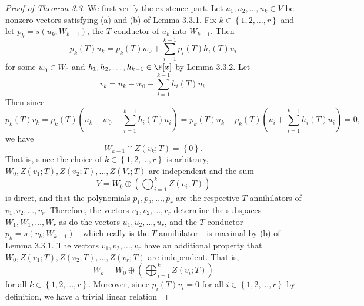 \documentclass[math_245.tex]{subfiles}
\begin{document}
    \begin{proof}[Proof of Theorem 3.3]
        We first verify the existence part. Let $u_1,u_2,\ldots,u_k\in V$ be nonzero vectors satisfying (a) and (b) of Lemma 3.3.1. Fix $k\in\left\lbrace 1,2,\ldots,r \right\rbrace $ and let $p_k=s\left( u_k;W_{k-1} \right) $, the $T$-conductor of $u_k$ into $W_{k-1}$. Then
        \begin{equation*}
            p_k(T)u_k = p_k(T)w_0 + \sum^{k-1}_{i=1} p_i(T)h_i(T)u_i
        \end{equation*}
        for some $w_0\in W_0$ and $h_1,h_2,\ldots,h_{k-1}\in\F[x]$ by Lemma 3.3.2. Let
        \begin{equation*}
            v_k = u_k - w_0 - \sum^{k-1}_{i=1} h_i(T)u_i.
        \end{equation*}
        Then since
        \begin{equation*}
            p_k(T)v_k = p_k(T)\left( u_k-w_0-\sum^{k-1}_{i=1} h_i(T)u_i \right) = p_k(T)u_k - p_k(T)\left( u_i+\sum^{k-1}_{i=1} h_i(T)u_i \right) = 0,
        \end{equation*}
        we have
        \begin{equation*}
            W_{k-1}\cap Z(v_k;T) = \left\lbrace 0 \right\rbrace .
        \end{equation*}
        That is, since the choice of $k\in\left\lbrace 1,2,\ldots,r \right\rbrace$ is arbitrary, $W_0, Z(v_1;T), Z(v_2;T), \ldots, Z(V_r;T)$ are independent and the sum
        \begin{equation*}
            V = W_0 \oplus \left( \bigoplus^{k}_{i=1} Z\left( v_i;T \right)  \right) 
        \end{equation*}
        is direct, and that the polynomials $p_1,p_2,\ldots,p_r$ are the respective $T$-annihilators of $v_1,v_2,\ldots,v_r$. Therefore, the vectors $v_1,v_2,\ldots,r_r$ determine the subspaces $W_1,W_1,\ldots,W_r$ as do the vectors $u_1,u_2,\ldots,u_r$, and the $T$-conductor $p_k = s\left( v_k;W_{k-1} \right)$ - which really is the $T$-annihilator - is maximal by (b) of Lemma 3.3.1. The vectors $v_1,v_2,\ldots,v_r$ have an additional property that $W_0,Z\left( v_1;T \right) ,Z\left( v_2;T \right), \ldots, Z\left( v_r;T \right) $ are independent. That is,
        \begin{equation*}
            W_k = W_0 \oplus \left( \bigoplus^{k}_{i=1} Z\left( v_i;T \right)  \right) 
        \end{equation*}
        for all $k\in \left\lbrace 1,2,\ldots,r \right\rbrace$. Moreover, since $p_i(T)v_i = 0$ for all $i\in \left\lbrace 1,2,\ldots,r \right\rbrace$ by definition, we have a trivial linear relation

\end{proof}
\end{document}
